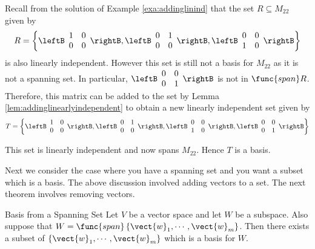 \begin{solution}
Recall from the solution of Example \ref{exa:addinglinind} that the set  $R \subseteq M_{22}$ given by 
\[
R = \left\{ \leftB \begin{array}{rr}
1 & 0 \\
0 & 0 
\end{array} \rightB, \leftB \begin{array}{rr}
0 & 1 \\
0 & 0 
\end{array} \rightB, \leftB \begin{array}{rr}
0 & 0 \\
1 & 0 
\end{array} \rightB \right\}
\]
is also linearly independent.
However this set is still not a basis for $M_{22}$ as it is not a spanning set. In particular, $\leftB \begin{array}{rr}
0 & 0 \\
0 & 1 
\end{array} \rightB$ is not in $\func{span} R$. Therefore, this matrix can be added to the set by Lemma \ref{lem:addinglinearlyindependent} to obtain a new linearly independent set given by 
\[
T = \left\{ \leftB \begin{array}{rr}
1 & 0 \\
0 & 0 
\end{array} \rightB, \leftB \begin{array}{rr}
0 & 1 \\
0 & 0 
\end{array} \rightB, \leftB \begin{array}{rr}
0 & 0 \\
1 & 0 
\end{array} \rightB, \leftB \begin{array}{rr}
0 & 0 \\
0 & 1 
\end{array} \rightB \right\}
\]

This set is linearly independent and now spans $M_{22}$. Hence $T$ is a basis. 
\end{solution}

Next we consider the case where you have a
spanning set and you want a subset which is a basis. The above discussion involved adding vectors to a set. The next theorem involves removing vectors. 

\begin{theorem}{Basis from a Spanning Set}
Let $V$ be a vector space and let $W$ be a subspace. Also
suppose that $W=\func{span}\left\{ \vect{w}_{1},\cdots ,\vect{w}
_{m}\right\} $. Then there exists a subset of $\left\{ \vect{w}_{1},\cdots ,
\vect{w}_{m}\right\} $ which is a basis for $W$.
\end{theorem}

